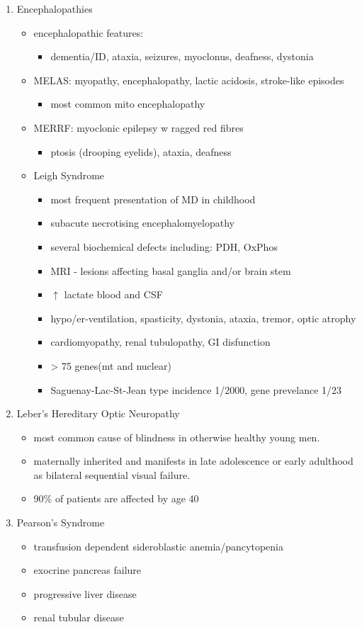 \documentclass{scrartcl}
\begin{document}
\begin{enumerate}
\item Encephalopathies
\label{sec:orge82bc08}
\begin{itemize}
\item encephalopathic features:
\begin{itemize}
\item dementia/ID, ataxia, seizures, myoclonus, deafness, dystonia
\end{itemize}
\item MELAS: myopathy, encephalopathy, lactic acidosis, stroke-like episodes
\begin{itemize}
\item most common mito encephalopathy
\end{itemize}
\item MERRF: myoclonic epilepsy w ragged red fibres
\begin{itemize}
\item ptosis (drooping eyelids), ataxia, deafness
\end{itemize}
\item Leigh Syndrome
\begin{itemize}
\item most frequent presentation of MD in childhood
\item subacute necrotising encephalomyelopathy
\item several biochemical defects including: PDH, OxPhos
\item MRI - lesions affecting basal ganglia and/or brain stem
\item \(\uparrow\) lactate blood and CSF
\item hypo/er-ventilation, spasticity, dystonia, ataxia, tremor, optic atrophy
\item cardiomyopathy, renal tubulopathy, GI disfunction
\item \textgreater{} 75 genes(mt and nuclear)
\item Saguenay-Lac-St-Jean type incidence 1/2000, gene prevelance 1/23
\end{itemize}
\end{itemize}
\item Leber’s Hereditary Optic Neuropathy
\label{sec:org4cf0a8e}
\begin{itemize}
\item most common cause of blindness in otherwise healthy young men.
\item maternally inherited and manifests in late adolescence or early
adulthood as bilateral sequential visual failure.
\item 90\% of patients are affected by age 40
\end{itemize}

\item Pearson's Syndrome
\label{sec:org72ff417}
\begin{itemize}
\item transfusion dependent sideroblastic anemia/pancytopenia
\item exocrine pancreas failure
\item progressive liver disease
\item renal tubular disease
\end{itemize}
\end{enumerate}
\end{document}
